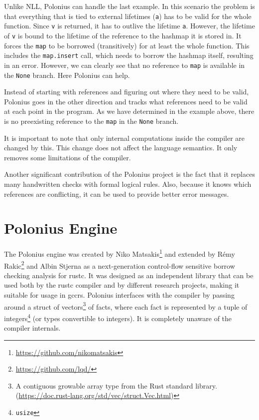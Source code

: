\documentclass[
  11pt,
  twoside,symmetric]{report}
\DeclareRobustCommand{\href}[2]{#2\footnote{\url{#1}}}
\begin{document}
Unlike NLL, Polonius can handle the last example. In this scenario the
problem is that everything that is tied to external lifetimes
(\texttt{\textquotesingle{}a}) has to be valid for the whole function.
Since \texttt{v} is returned, it has to outlive the lifetime
\texttt{\textquotesingle{}a}. However, the lifetime of \texttt{v} is
bound to the lifetime of the reference to the hashmap it is stored in.
It forces the \texttt{map} to be borrowed (transitively) for at least
the whole function. This includes the \texttt{map.insert} call, which
needs to borrow the hashmap itself, resulting in an error. However, we
can clearly see that no reference to \texttt{map} is available in the
\texttt{None} branch. Here Polonius can help.

Instead of starting with references and figuring out where they need to
be valid, Polonius goes in the other direction and tracks what
references need to be valid at each point in the program. As we have
determined in the example above, there is no preexisting reference to
the \texttt{map} in the \texttt{None} branch.

It is important to note that only internal computations inside the
compiler are changed by this. This change does not affect the language
semantics. It only removes some limitations of the compiler.

Another significant contribution of the Polonius project is the fact
that it replaces many handwritten checks with formal logical rules.
Also, because it knows which references are conflicting, it can be used
to provide better error messages.

\chapter{Polonius Engine}\label{sec:polonius-engine}

The Polonius engine was created by
\href{https://github.com/nikomatsakis}{Niko Matsakis} and extended by
\href{https://github.com/lqd/}{Rémy Rakic} and Albin
Stjerna as a next-generation
control-flow sensitive borrow checking analysis for rustc. It was
designed as an independent library that can be used both by the rustc
compiler and by different research projects, making it suitable for
usage in gccrs. Polonius interfaces with the compiler by passing around
a struct of vectors\footnote{A contiguous growable array type from the
  Rust standard library.
  (\url{https://doc.rust-lang.org/std/vec/struct.Vec.html})} of facts,
where each fact is represented by a tuple of integers\footnote{\texttt{usize}}
(or types convertible to integers). It is completely unaware of the
compiler internals.
\end{document}
